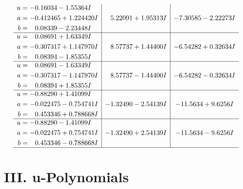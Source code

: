 \documentclass[1p]{elsarticle_modified}
\theoremstyle{definition}
\begin{document}
$$\begin{array}{c|c|c}
\begin{aligned}
u &= -0.16034 - 1.55364 I \\
a &= -0.412465 + 1.224420 I \\
b &= \phantom{-}0.08339 - 2.23448 I\end{aligned}
 & \phantom{-}5.22091 + 1.95313 I & -7.30585 - 2.22273 I \\ \hline\begin{aligned}
u &= \phantom{-}0.08691 + 1.63349 I \\
a &= -0.307317 + 1.147970 I \\
b &= \phantom{-}0.08394 - 1.85355 I\end{aligned}
 & \phantom{-}8.57737 + 1.44400 I & -6.54282 + 0.32634 I \\ \hline\begin{aligned}
u &= \phantom{-}0.08691 - 1.63349 I \\
a &= -0.307317 - 1.147970 I \\
b &= \phantom{-}0.08394 + 1.85355 I\end{aligned}
 & \phantom{-}8.57737 - 1.44400 I & -6.54282 - 0.32634 I \\ \hline\begin{aligned}
u &= -0.88290 + 1.41099 I \\
a &= -0.022475 - 0.754741 I \\
b &= \phantom{-}0.453346 + 0.788668 I\end{aligned}
 & -1.32490 - 2.54139 I & -11.5634 + 9.6256 I \\ \hline\begin{aligned}
u &= -0.88290 - 1.41099 I \\
a &= -0.022475 + 0.754741 I \\
b &= \phantom{-}0.453346 - 0.788668 I\end{aligned}
 & -1.32490 + 2.54139 I & -11.5634 - 9.6256 I\\
 \hline 
 \end{array}$$\newpage
\newpage\renewcommand{\arraystretch}{1}
\centering \section*{ III. u-Polynomials}
\end{document}
